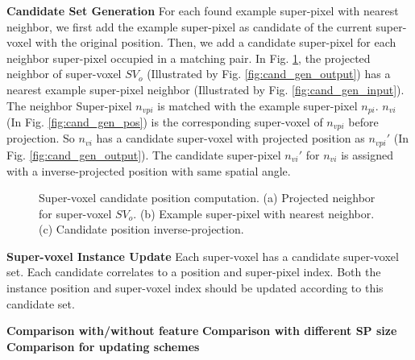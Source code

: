 \noindent
\textbf{Candidate Set Generation} 
For each found example super-pixel with nearest neighbor, we first add the example super-pixel as candidate of the current super-voxel with the original position. Then, we add a candidate super-pixel for each neighbor super-pixel occupied in a matching pair. In Fig. \ref{fig:cand_generation}, the projected neighbor of super-voxel $SV_o$ (Illustrated by Fig. \ref{fig:cand_gen_output}) has a nearest example super-pixel neighbor (Illustrated by Fig. \ref{fig:cand_gen_input}). The neighbor Super-pixel $n_{vpi}$ is matched with the example super-pixel $n_{pi}$. $n_{vi}$ (In Fig. \ref{fig:cand_gen_pos}) is the corresponding super-voxel of $n_{vpi}$ before projection. So $n_{vi}$ has a candidate super-voxel with projected position as $n_{vpi}'$ (In Fig. \ref{fig:cand_gen_output}). The candidate super-pixel $n_{vi}'$ for $n_{vi}$ is assigned with a inverse-projected position with same spatial angle.
\begin{figure}[h!]
	\centering
	\caption{Super-voxel candidate position computation. (a) Projected neighbor for super-voxel $SV_o$. (b) Example super-pixel with nearest neighbor. (c) Candidate position inverse-projection.}
	\label{fig:cand_generation}
\end{figure}

\noindent
\textbf{Super-voxel Instance Update} Each super-voxel has a candidate super-voxel set. Each candidate correlates to a position and super-pixel index. Both the instance position and super-voxel index should be updated according to this candidate set.  

\textbf{Comparison with/without feature}
\textbf{Comparison with different SP size}
\textbf{Comparison for updating schemes}